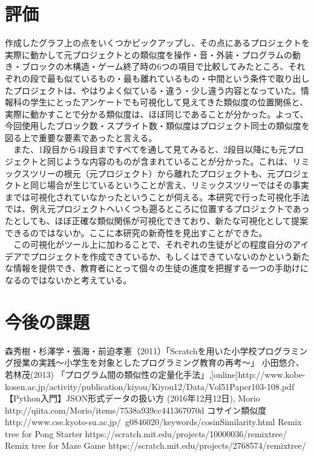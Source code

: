 \documentclass[twocolumn,9pt,a4paper]{jsarticle}
\begin{document}
\section{評価}
作成したグラフ上の点をいくつかピックアップし、その点にあるプロジェクトを実際に動かして元プロジェクトとの類似度を操作・音・外装・プログラムの動き・ブロックの木構造・ゲーム終了時の6つの項目で比較してみたところ、それぞれの段で最も似ているもの・最も離れているもの・中間という条件で取り出したプロジェクトは、やはりよく似ている・違う・少し違う内容となっていた。情報科の学生にとったアンケートでも可視化して見えてきた類似度の位置関係と、実際に動かすことで分かる類似度は、ほぼ同じであることが分かった。よって、今回使用したブロック数・スプライト数・類似度はプロジェクト同士の類似度を図る上で重要な要素であったと言える。
\\
　また、1段目から4段目まですべてを通して見てみると、2段目以降にも元プロジェクトと同じような内容のものが含まれていることが分かった。これは、リミックスツリーの根元（元プロジェクト）から離れたプロジェクトも、元プロジェクトと同じ場合が生じているということが言え、リミックスツリーではその事実までは可視化されていなかったということが伺える。本研究で行った可視化手法では、例え元プロジェクトへいくつも遡るところに位置するプロジェクトであったとしても、ほぼ正確な類似関係が可視化できており、新たな可視化として提案できるのではないか。ここに本研究の新奇性を見出すことができた。
\\
　この可視化がツール上に加わることで、それぞれの生徒がどの程度自分のアイデアでプロジェクトを作成できているか、もしくはできていないのかという新たな情報を提供でき、教育者にとって個々の生徒の進度を把握する一つの手助けになるのではないかと考えている。

\section{今後の課題}


\begin{thebibliography}{6}
森秀樹・杉澤学・張海・前迫孝憲（2011）「Scratchを用いた小学校プログラミング授業の実践〜小学生を対象としたプログラミング教育の再考〜」
小田悠介、若林茂(2013) 「プログラム間の類似性の定量化手法」,[online]http://www.kobe-kosen.ac.jp/activity/publication/kiyou/Kiyou12/Data/Vol51Paper103-108.pdf
【Python入門】JSON形式データの扱い方 (2016年12月12日), Morio http://qiita.com/Morio/items/7538a939cc441367070d
 コサイン類似度 http://www.cse.kyoto-su.ac.jp/~g0846020/keywords/cosinSimilarity.html
Remix tree for Pong Starter https://scratch.mit.edu/projects/10000036/remixtree/
Remix tree for Maze Game https://scratch.mit.edu/projects/2768574/remixtree/

\end{thebibliography}

%
%
\end{document}

